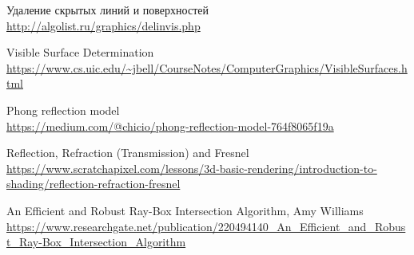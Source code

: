 



\begin{thebibliography}{9}
    
    Удаление скрытых линий и поверхностей
    \\\url{http://algolist.ru/graphics/delinvis.php}
    
    Visible Surface Determination
    \\\url{https://www.cs.uic.edu/~jbell/CourseNotes/ComputerGraphics/VisibleSurfaces.html}
    
    Phong reflection model
    \\\url{https://medium.com/@chicio/phong-reflection-model-764f8065f19a}
    
    Reflection, Refraction (Transmission) and Fresnel
    \\\url{https://www.scratchapixel.com/lessons/3d-basic-rendering/introduction-to-shading/reflection-refraction-fresnel}
    
    An Efficient and Robust Ray-Box Intersection Algorithm, Amy Williams
    \\\url{https://www.researchgate.net/publication/220494140_An_Efficient_and_Robust_Ray-Box_Intersection_Algorithm}



    






\end{thebibliography}
